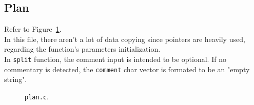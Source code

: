 \documentclass{article}
\begin{document}
\subsection*{Plan}
Refer to Figure~\ref{fig:plan}. \\
In this file, there aren't a lot of data copying since pointers are heavily used, regarding the function's parameters initialization. \\
In {\tt split} function, the comment input is intended to be optional. If no commentary is detected, the {\tt comment} char vector is formated to be an "empty string". \\
\begin{figure}[h]
  \centering
  \caption{{\tt plan.c}.}
  \label{fig:plan}
\end{figure}
\end{document}
